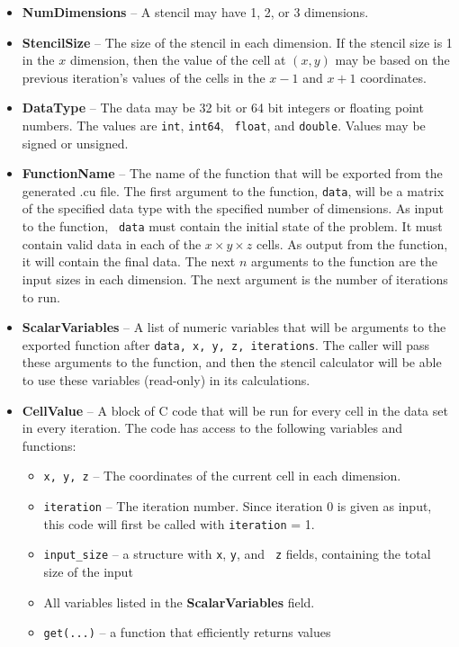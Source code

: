 \documentclass{styles/sig-alternate}
\begin{document}
\begin{itemize}
\item {\bf NumDimensions} -- A stencil may have 1, 2, or 3 dimensions.
\item {\bf StencilSize} -- The size of the stencil in each dimension.
  If the stencil size is 1 in the $x$ dimension, then the value of the
  cell at $(x, y)$ may be based on the previous iteration's values of
  the cells in the $x-1$ and $x+1$ coordinates.
\item {\bf DataType} -- The data may be 32 bit or 64 bit integers or
  floating point numbers.  The values are {\tt int}, {\tt int64}, {\tt
    float}, and {\tt double}.  Values may be signed or unsigned.
\item {\bf FunctionName} -- The name of the function that will be exported
  from the generated .cu file.  The first argument to the function,
  {\tt data}, will be a matrix of the specified data type with the
  specified number of dimensions.  As input to the function, {\tt
    data} must contain the initial state of the problem.  It must
  contain valid data in each of the $x \times y \times z$ cells.  As
  output from the function, it will contain the final data.  The next
  $n$ arguments to the function are the input sizes in each dimension.
  The next argument is the number of iterations to run.
\item {\bf ScalarVariables} -- A list of numeric variables that will
  be arguments to the exported function after {\tt data, x, y, z,
    iterations}.  The caller will pass these arguments to the
  function, and then the stencil calculator will be able to use these
  variables (read-only) in its calculations.
\item {\bf CellValue} -- A block of C code that will be run for every
  cell in the data set in every iteration.  The code has access to the
  following variables and functions:
\begin{itemize}
\item {\tt x, y, z} -- The coordinates of the current cell in each
  dimension.
\item {\tt iteration} -- The iteration number.  Since iteration 0 is
  given as input, this code will first be called with {\tt iteration}
  = 1.
\item {\tt input\_size} -- a structure with {\tt x}, {\tt y}, and {\tt
  z} fields, containing the total size of the input
\item All variables listed in the {\bf ScalarVariables} field.
\item {\tt get(...)} -- a function that efficiently returns values

\end{itemize}
\end{itemize}
\end{document}

